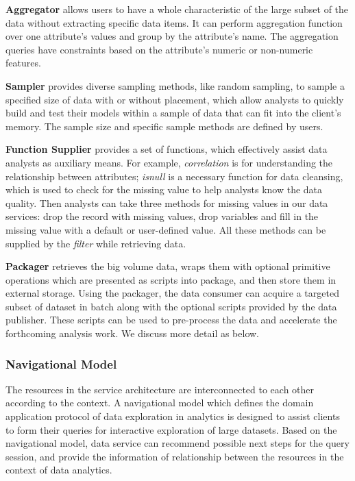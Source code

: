 \documentclass[10pt, conference, compsocconf]{IEEEtran}
\begin{document}
\textbf{Aggregator} allows users to have a whole characteristic of the large subset of the data without extracting specific data items. It can perform aggregation function over one attribute’s values and group by the attribute’s name. The aggregation queries have constraints based on the attribute’s numeric or non-numeric features.  

\textbf{Sampler} provides diverse sampling methods, like random sampling, to sample a specified size of data with or without placement, which allow analysts to quickly build and test their models within a sample of data that can fit into the client’s memory. The sample size and specific sample methods are defined by users. 

\textbf{Function Supplier} provides a set of functions, which effectively assist data analysts as auxiliary means. For example, \textit{correlation} is for understanding the relationship between attributes; \textit{isnull} is a necessary function for data cleansing, which is used to check for the missing value to help analysts know the data quality. Then analysts can take three methods for missing values in our data services: drop the record with missing values, drop variables and fill in the missing value with a default or user-defined value. All these methods can be supplied by the \textit{filter} while retrieving data.

\textbf{Packager} retrieves the big volume data, wraps them with optional primitive operations which are presented as scripts into package, and then store them in external storage. Using the packager, the data consumer can acquire a targeted subset of dataset in batch along with the optional scripts provided by the data publisher. These scripts can be used to pre-process the data and accelerate the forthcoming analysis work. We discuss more detail as below.
\subsubsection{Navigational Model}
The resources in the service architecture are interconnected to each other according to the context. A navigational model which defines the domain application protocol of data exploration in analytics is designed to assist clients to form their queries for interactive exploration of large datasets. Based on the navigational model, data service can recommend possible next steps for the query session, and provide the information of relationship between the resources in the context of data analytics. 
\end{document}
